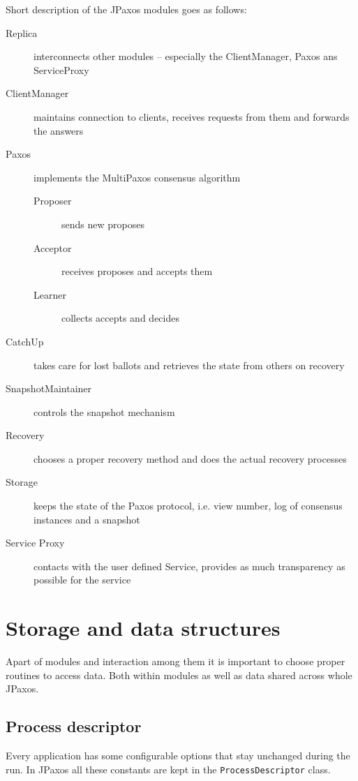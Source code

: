 Short description of the JPaxos modules goes as follows:

\begin{description}
  \item[Replica ] interconnects other modules -- especially the ClientManager, Paxos ans ServiceProxy
  \item[ClientManager ] maintains connection to clients, receives requests from them and forwards the answers
  \item[Paxos ] implements the MultiPaxos consensus algorithm
  \begin{description}
    \item[Proposer ] sends new proposes
    \item[Acceptor ] receives proposes and accepts them
    \item[Learner ] collects accepts and decides
  \end{description}
  \item[CatchUp ] takes care for lost ballots and retrieves the state from others on recovery
  \item[SnapshotMaintainer ] controls the snapshot mechanism
  \item[Recovery ] chooses a proper recovery method and does the actual recovery processes
  \item[Storage ] keeps the state of the Paxos protocol, i.e. view number, log of consensus instances and a snapshot
  \item[Service Proxy ] contacts with the user defined Service, provides as much trans\-pa\-rency as possible for the service
\end{description}

\section{Storage and data structures}
\label{sec:storage_and_data_structures}

Apart of modules and interaction among them it is important to choose proper routines to access data. Both within modules as well as data shared across whole JPaxos.%

\subsection{Process descriptor}

Every application has some configurable options that stay unchanged during the run. In JPaxos all these constants are kept in the \texttt{ProcessDescriptor} class.


